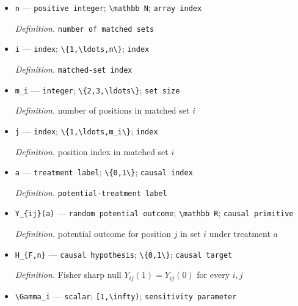 \documentclass{article}
\begin{document}
\begin{itemize}
  \item \texttt{n} --- \texttt{positive integer}; \texttt{\textbackslash{}\allowbreak{}mathbb N}; \texttt{array index}
  \par\smallskip\noindent\emph{Definition.} \texttt{number of matched sets}
  \item \texttt{i} --- \texttt{index}; \texttt{\textbackslash{}\allowbreak{}\{1,\allowbreak{}\textbackslash{}\allowbreak{}ldots,\allowbreak{}n\textbackslash{}\allowbreak{}\}\allowbreak{}}; \texttt{index}
  \par\smallskip\noindent\emph{Definition.} \texttt{matched-\allowbreak{}set index}
  \item \texttt{m\_\allowbreak{}i} --- \texttt{integer}; \texttt{\textbackslash{}\allowbreak{}\{2,\allowbreak{}3,\allowbreak{}\textbackslash{}\allowbreak{}ldots\textbackslash{}\allowbreak{}\}\allowbreak{}}; \texttt{set size}
  \par\smallskip\noindent\emph{Definition.} number of positions in matched set \(i\)
  \item \texttt{j} --- \texttt{index}; \texttt{\textbackslash{}\allowbreak{}\{1,\allowbreak{}\textbackslash{}\allowbreak{}ldots,\allowbreak{}m\_\allowbreak{}i\textbackslash{}\allowbreak{}\}\allowbreak{}}; \texttt{index}
  \par\smallskip\noindent\emph{Definition.} position index in matched set \(i\)
  \item \texttt{a} --- \texttt{treatment label}; \texttt{\textbackslash{}\allowbreak{}\{0,\allowbreak{}1\textbackslash{}\allowbreak{}\}\allowbreak{}}; \texttt{causal index}
  \par\smallskip\noindent\emph{Definition.} \texttt{potential-\allowbreak{}treatment label}
  \item \texttt{Y\_\allowbreak{}\{ij\}\allowbreak{}(a)} --- \texttt{random potential outcome}; \texttt{\textbackslash{}\allowbreak{}mathbb R}; \texttt{causal primitive}
  \par\smallskip\noindent\emph{Definition.} potential outcome for position \(j\) in set \(i\) under treatment \(a\)
  \item \texttt{H\_\allowbreak{}\{F,\allowbreak{}n\}\allowbreak{}} --- \texttt{causal hypothesis}; \texttt{\textbackslash{}\allowbreak{}\{0,\allowbreak{}1\textbackslash{}\allowbreak{}\}\allowbreak{}}; \texttt{causal target}
  \par\smallskip\noindent\emph{Definition.} Fisher sharp null \(Y_{ij}(1)=Y_{ij}(0)\) for every \(i,j\)
  \item \texttt{\textbackslash{}\allowbreak{}Gamma\_\allowbreak{}i} --- \texttt{scalar}; \texttt{[1,\allowbreak{}\textbackslash{}\allowbreak{}infty)}; \texttt{sensitivity parameter}

\end{itemize}
\end{document}
